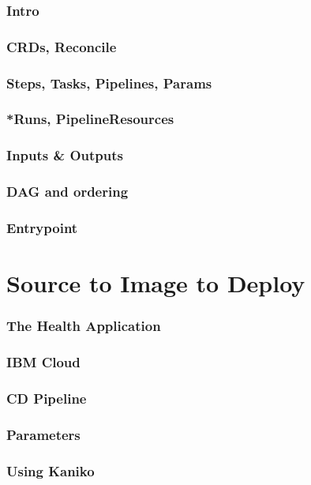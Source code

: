 \documentclass[aspectratio=169,11pt,hyperref={colorlinks=true}]{beamer}
\begin{document}
\begin{lblackrwhiteframe}
\begin{grayframe}
  \frametitle{Intro}
\end{grayframe}

\begin{grayframe}
  \frametitle{CRDs, Reconcile}
\end{grayframe}

\begin{grayframe}
  \frametitle{Steps, Tasks, Pipelines, Params}
\end{grayframe}

\begin{grayframe}
  \frametitle{*Runs, PipelineResources}
\end{grayframe}

\begin{grayframe}
  \frametitle{Inputs \& Outputs}
\end{grayframe}

\begin{grayframe}
  \frametitle{DAG and ordering}
\end{grayframe}

\begin{grayframe}
  \frametitle{Entrypoint}
\end{grayframe}

\section{Source to Image to Deploy}

\begin{grayframe}
  \frametitle{The Health Application}
\end{grayframe}

\begin{grayframe}
  \frametitle{IBM Cloud}
\end{grayframe}

\begin{grayframe}
  \frametitle{CD Pipeline}
\end{grayframe}

\begin{grayframe}
  \frametitle{Parameters}
\end{grayframe}

\begin{grayframe}
  \frametitle{Using Kaniko}
\end{grayframe}


\end{lblackrwhiteframe}
\end{document}
